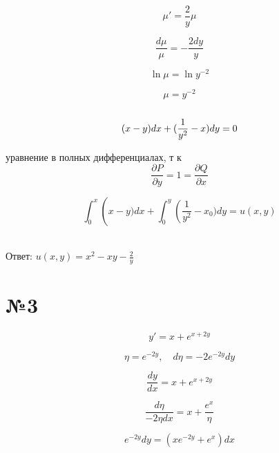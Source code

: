 \documentclass{article}
\begin{document}
\begin{equation*}
    \mu' = \frac{2}{y}\mu
\end{equation*}

\begin{equation*}
    \frac{d\mu}{\mu} = - \frac{2dy}{y}
\end{equation*}

\begin{equation*}
    \ln{\mu} = \ln{y^{-2}}
\end{equation*}

\begin{equation*}
    \mu = y^{-2}
\end{equation*}
\\
\begin{equation*}
    (x - y)dx + (\frac{1}{y^2}-x)dy = 0\\
\end{equation*}

уравнение в полных дифференциалах, т к 
\begin{equation*}
\frac{\partial P}{\partial y}=1=
\frac{\partial Q}{\partial x}
\end{equation*}

\begin{equation*}
\int_{0}^{x}\left(x-y)dx+\int_{0}^{y}\left(\frac{1}{y^2}-x_0)dy=u(x,y)
\end{equation*}

\\Ответ: $ u(x,y)=x^2 - xy - \frac{2}{y}$

\section*{№3}

\begin{equation*}
    y' = x + e^{x + 2y}
\end{equation*}

\begin{equation*}
   \eta = e^{-2y}, \label{pd} \quad    d\eta = -2e^{-2y}dy
\end{equation*}

\begin{equation*}
    \frac{dy}{dx} = x + e^{x + 2y}
\end{equation*}

\begin{equation*}
    \frac{d\eta}{-2\eta dx} = x + \frac{e^{x}}{\eta}
\end{equation*}

\begin{equation*}
    e^{-2y}dy = (xe^{-2y} + e^x)dx
\end{equation*}
\end{document}
